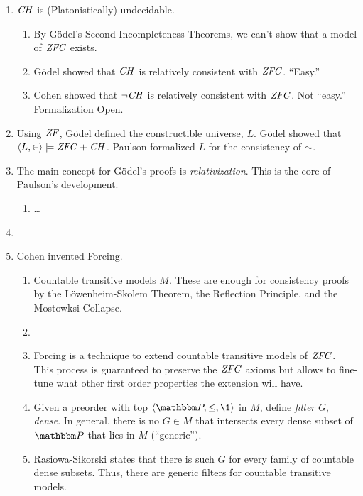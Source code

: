   
\begin{enumerate}
\item $\mathit{CH}$ is (Platonistically) undecidable.
  \begin{enumerate}
  \item By G\"odel's Second Incompleteness Theorems, we can't show
    that a model of $\mathit{ZFC}$ exists.
  \item G\"odel showed that $\mathit{CH}$ is relatively consistent with
    $\mathit{ZFC}$. ``Easy.''
  \item Cohen showed that  $\neg\mathit{CH}$ is relatively consistent with
    $\mathit{ZFC}$. Not ``easy.'' Formalization Open.
  \end{enumerate}
\item Using $\mathit{ZF}$, G\"odel defined the constructible universe,
  $L$. G\"odel showed that $\langle L,\in\rangle\models \mathit{ZFC}+\mathit{CH}$. Paulson formalized $L$
  for the consistency of $\AC$.
\item The main concept for G\"odel's proofs is
  \emph{relativization}. This is the core of Paulson's development.
  \begin{enumerate}
  \item \dots
  \end{enumerate}
\item 
\item Cohen invented Forcing.
  \begin{enumerate}
  \item Countable transitive models $M$. These are enough for consistency
    proofs by the L\"owenheim-Skolem Theorem, the Reflection
    Principle, and the Mostowksi Collapse.
  \item 
  \item Forcing is a technique to extend countable transitive models of
    $\mathit{ZFC}$. This process is guaranteed to preserve the $\mathit{ZFC}$
    axioms but allows to fine-tune what other first order properties the
    extension will have. 
  \item Given a preorder with top $\lb\PP,\leq,\1\rb$ in $M$, define
    \emph{filter} $G$, \emph{dense}. In general, there is no  $G\in M$
    that intersects every dense
    subset of $\PP$ that lies in $M$ (``generic'').
  \item Rasiowa-Sikorski states that there is such $G$ for every
    family of countable dense subsets. Thus, there are generic filters
    for countable transitive models.
  \end{enumerate}

\end{enumerate}


